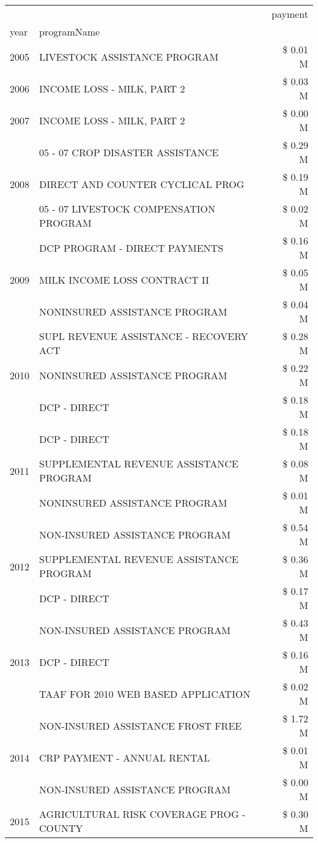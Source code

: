 \begin{tabular}{llr}
\toprule
 &  & payment \\
year & programName &  \\
\midrule
2005 & LIVESTOCK ASSISTANCE PROGRAM & \$ 0.01 M \\
\cline{1-3}
2006 & INCOME LOSS - MILK, PART 2 & \$ 0.03 M \\
\cline{1-3}
2007 & INCOME LOSS - MILK, PART 2 & \$ 0.00 M \\
\cline{1-3}
\multirow[t]{3}{*}{2008} & 05 - 07 CROP DISASTER ASSISTANCE & \$ 0.29 M \\
 & DIRECT AND COUNTER CYCLICAL PROG & \$ 0.19 M \\
 & 05 - 07 LIVESTOCK COMPENSATION PROGRAM & \$ 0.02 M \\
\cline{1-3}
\multirow[t]{3}{*}{2009} & DCP PROGRAM - DIRECT PAYMENTS & \$ 0.16 M \\
 & MILK INCOME LOSS CONTRACT II & \$ 0.05 M \\
 & NONINSURED ASSISTANCE PROGRAM & \$ 0.04 M \\
\cline{1-3}
\multirow[t]{3}{*}{2010} & SUPL REVENUE ASSISTANCE - RECOVERY ACT & \$ 0.28 M \\
 & NONINSURED ASSISTANCE PROGRAM & \$ 0.22 M \\
 & DCP - DIRECT & \$ 0.18 M \\
\cline{1-3}
\multirow[t]{3}{*}{2011} & DCP - DIRECT & \$ 0.18 M \\
 & SUPPLEMENTAL REVENUE ASSISTANCE PROGRAM & \$ 0.08 M \\
 & NONINSURED ASSISTANCE PROGRAM & \$ 0.01 M \\
\cline{1-3}
\multirow[t]{3}{*}{2012} & NON-INSURED ASSISTANCE PROGRAM & \$ 0.54 M \\
 & SUPPLEMENTAL REVENUE ASSISTANCE PROGRAM & \$ 0.36 M \\
 & DCP - DIRECT & \$ 0.17 M \\
\cline{1-3}
\multirow[t]{3}{*}{2013} & NON-INSURED ASSISTANCE PROGRAM & \$ 0.43 M \\
 & DCP - DIRECT & \$ 0.16 M \\
 & TAAF FOR 2010 WEB BASED APPLICATION & \$ 0.02 M \\
\cline{1-3}
\multirow[t]{3}{*}{2014} & NON-INSURED ASSISTANCE FROST FREE & \$ 1.72 M \\
 & CRP PAYMENT - ANNUAL RENTAL & \$ 0.01 M \\
 & NON-INSURED ASSISTANCE PROGRAM & \$ 0.00 M \\
\cline{1-3}
\multirow[t]{3}{*}{2015} & AGRICULTURAL RISK COVERAGE PROG - COUNTY & \$ 0.30 M \\

\end{tabular}
